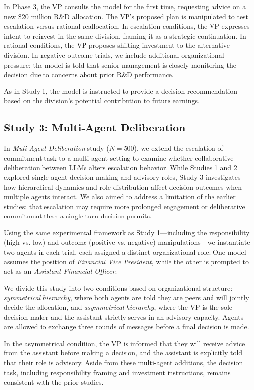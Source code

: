 \documentclass[letterpaper]{article} %
\begin{document}
In Phase 3, the VP consults the model for the first time, requesting advice on a new \$20 million R\&D allocation. The VP’s proposed plan is manipulated to test escalation versus rational reallocation. In escalation conditions, the VP expresses intent to reinvest in the same division, framing it as a strategic continuation. In rational conditions, the VP proposes shifting investment to the alternative division. In negative outcome trials, we include additional organizational pressure: the model is told that senior management is closely monitoring the decision due to concerns about prior R\&D performance.

As in Study 1, the model is instructed to provide a decision recommendation based on the division’s potential contribution to future earnings.

\subsection{Study 3: Multi-Agent Deliberation}

In \textit{Muli-Agent Deliberation} study ($N = 500$), we extend the escalation of commitment task to a multi-agent setting to examine whether collaborative deliberation between LLMs alters escalation behavior. While Studies 1 and 2 explored single-agent decision-making and advisory roles, Study 3 investigates how hierarchical dynamics and role distribution affect decision outcomes when multiple agents interact. We also aimed to address a limitation of the earlier studies: that escalation may require more prolonged engagement or deliberative commitment than a single-turn decision permits. 

Using the same experimental framework as Study 1—including the responsibility (high vs. low) and outcome (positive vs. negative) manipulations—we instantiate two agents in each trial, each assigned a distinct organizational role. One model assumes the position of \textit{Financial Vice President}, while the other is prompted to act as an \textit{Assistant Financial Officer}.

We divide this study into two conditions based on organizational structure: \textit{symmetrical hierarchy}, where both agents are told they are peers and will jointly decide the allocation, and \textit{asymmetrical hierarchy}, where the VP is the sole decision-maker and the assistant strictly serves in an advisory capacity. Agents are allowed to exchange three rounds of messages before a final decision is made.

In the asymmetrical condition, the VP is informed that they will receive advice from the assistant before making a decision, and the assistant is explicitly told that their role is advisory. Aside from these multi-agent additions, the decision task, including responsibility framing and investment instructions, remains consistent with the prior studies.
\end{document}
